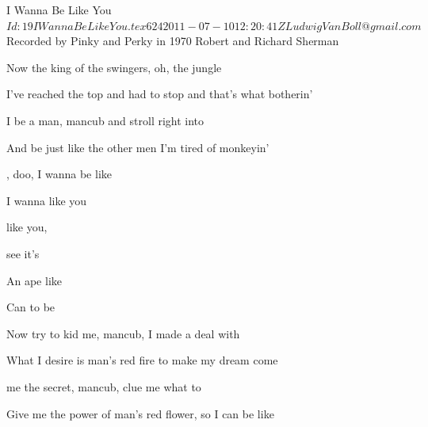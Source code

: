 \begin{SBSong}{I Wanna Be Like You}
  {$Id: 19IWannaBeLikeYou.tex 624 2011-07-10 12:20:41Z LudwigVanBoll@gmail.com $}
  {Recorded by Pinky and Perky in 1970}
  {Robert and Richard Sherman}
  \begin{SBVerse}
	Now  the king of the swingers, oh, the jungle 

	I've reached the top and had to stop and that's what botherin' 
	
	I  be a man, mancub and stroll right into 

	And be just like the other men I'm tired of monkeyin' 
  \end{SBVerse}
  \begin{SBChorus}
	,  doo, I wanna be like 

	I wanna  like you

	 like you, 

	 see it's 

	An ape like 

	Can  to be  
  \end{SBChorus}
  \begin{SBVerse}
	Now  try to kid me, mancub, I made a deal with 

	What I desire is man's red fire to make my dream come 

	 me the secret, mancub, clue me what to 

	Give me the power of man's red flower, so I can be like 
  \end{SBVerse}  
\end{SBSong}
